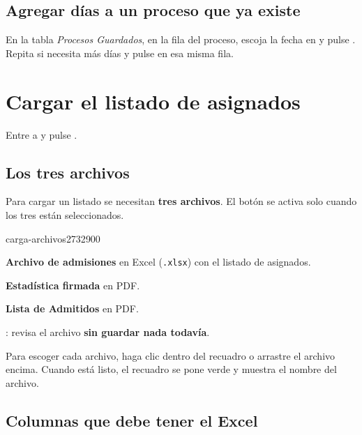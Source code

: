 \subsection{Agregar días a un proceso que ya existe}

En la tabla \emph{Procesos Guardados}, en la fila del proceso, escoja la fecha en
 y pulse \boton{+}. Repita si necesita más días y pulse
 en esa misma fila.

\section{Cargar el listado de asignados}

Entre a  y pulse .

\subsection{Los tres archivos}

Para cargar un listado se necesitan \textbf{tres archivos}. El botón  se
activa solo cuando los tres están seleccionados.

\begin{captura}{carga-archivos}{2732}{900}
\end{captura}

\begin{leyenda}
  \item[1] \textbf{Archivo de admisiones} en Excel (\texttt{.xlsx}) con el listado de asignados.
  \item[2] \textbf{Estadística firmada} en PDF.
  \item[3] \textbf{Lista de Admitidos} en PDF.
  \item[4] : revisa el archivo \textbf{sin guardar nada todavía}.
\end{leyenda}

Para escoger cada archivo, haga clic dentro del recuadro o arrastre el archivo encima. Cuando
está listo, el recuadro se pone verde y muestra el nombre del archivo.

\subsection{Columnas que debe tener el Excel}

